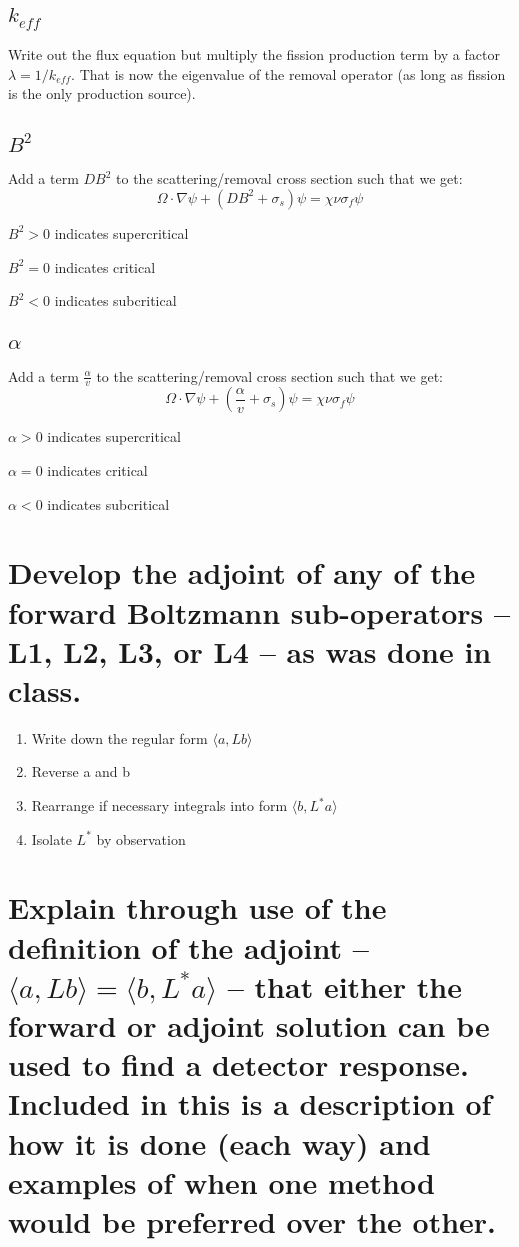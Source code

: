 \documentclass{article}
\begin{document}
\subsection{$k_{eff}$}
Write out the flux equation but multiply the fission production term by a factor $\lambda = 1 / k_{eff}$. That is now the eigenvalue of the removal operator (as long as fission is the only production source).

\subsection{$B^2$}
Add a term $DB^2$ to the scattering/removal cross section such that we get:
$$
	\Omega \cdot \nabla \psi + (DB^2 + \sigma_s) \psi = \chi \nu \sigma_f \psi
$$

$B^2 > 0$ indicates supercritical

$B^2 = 0$ indicates critical

$B^2 < 0$ indicates subcritical

\subsection{$\alpha$}
Add a term $\frac{\alpha}{v}$ to the scattering/removal cross section such that we get:
$$
	\Omega \cdot \nabla \psi + (\frac{\alpha}{v} + \sigma_s) \psi = \chi \nu \sigma_f \psi
$$

$\alpha > 0$ indicates supercritical

$\alpha = 0$ indicates critical

$\alpha < 0$ indicates subcritical

\newpage
\section{Develop the adjoint of any of the forward Boltzmann sub-operators -- L1, L2, L3, or L4 -- as was done in class.}

\begin{enumerate}
	\item Write down the regular form $\langle a, Lb \rangle$
	\item Reverse a and b
	\item Rearrange if necessary integrals into form $\langle b, L^* a \rangle$
	\item Isolate $L^*$ by observation
\end{enumerate}

\newpage
\section{Explain through use of the definition of the adjoint -- $\langle a, Lb \rangle = \langle b,L^*a \rangle$ -- that either the forward or adjoint solution can be used to find a detector response.  Included in this is a description of how it is done (each way) and examples of when one method would be preferred over the other.}
\end{document}

